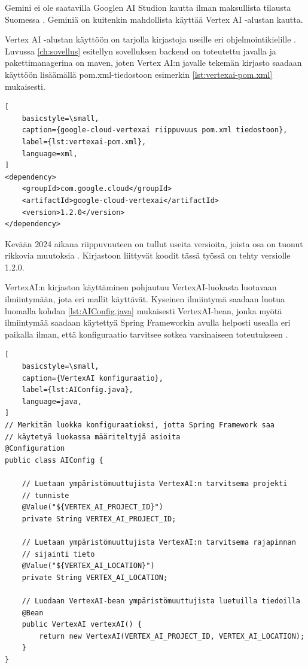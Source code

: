 Gemini ei ole saatavilla Googlen AI Studion kautta ilman maksullista tilausta
Suomessa \parencite{googleAiAvailableRegions}. Geminiä on kuitenkin mahdollista
käyttää Vertex AI -alustan kautta.

Vertex AI -alustan käyttöön on tarjolla kirjastoja useille eri
ohjelmointikielille \parencite{vertexAiGenerativeAiQuickstart}. Luvussa
\ref{ch:sovellus} esitellyn sovelluksen backend on toteutettu javalla ja
pakettimanagerina on maven, joten Vertex AI:n javalle tekemän kirjasto saadaan
käyttöön lisäämällä pom.xml-tiedostoon esimerkin \ref{lst:vertexai-pom.xml}
mukaisesti.

\begin{lstlisting}[
    basicstyle=\small,
    caption={google-cloud-vertexai riippuvuus pom.xml tiedostoon},
    label={lst:vertexai-pom.xml},
    language=xml,
]
<dependency>
    <groupId>com.google.cloud</groupId>
    <artifactId>google-cloud-vertexai</artifactId>
    <version>1.2.0</version>
</dependency>
\end{lstlisting}

Kevään 2024 aikana riippuvuuteen on tullut useita versioita, joista osa on
tuonut rikkovia muutoksia \parencite{mavenGoogleVertexAIAPI}. Kirjastoon
liittyvät koodit tässä työssä on tehty versiolle 1.2.0.

VertexAI:n kirjaston käyttäminen pohjautuu VertexAI-luokasta luotavaan
ilmiintymään, jota eri mallit käyttävät. Kyseinen ilmiintymä saadaan luotua
luomalla kohdan \ref{lst:AIConfig.java} mukaisesti VertexAI-bean, jonka myötä
ilmiintymää saadaan käytettyä Spring Frameworkin avulla helposti usealla eri
paikalla ilman, että konfiguraatio tarvitsee sotkea varsinaiseen toteutukseen
\parencite{baeldungSpringBean}.

\begin{lstlisting}[
    basicstyle=\small,
    caption={VertexAI konfiguraatio},
    label={lst:AIConfig.java},
    language=java,
]
// Merkitän luokka konfiguraatioksi, jotta Spring Framework saa
// käytetyä luokassa määriteltyjä asioita
@Configuration
public class AIConfig {

    // Luetaan ympäristömuuttujista VertexAI:n tarvitsema projekti
    // tunniste
    @Value("${VERTEX_AI_PROJECT_ID}")
    private String VERTEX_AI_PROJECT_ID;

    // Luetaan ympäristömuuttujista VertexAI:n tarvitsema rajapinnan
    // sijainti tieto
    @Value("${VERTEX_AI_LOCATION}")
    private String VERTEX_AI_LOCATION;

    // Luodaan VertexAI-bean ympäristömuuttujista luetuilla tiedoilla
    @Bean
    public VertexAI vertexAI() {
        return new VertexAI(VERTEX_AI_PROJECT_ID, VERTEX_AI_LOCATION);
    }
}
\end{lstlisting}

